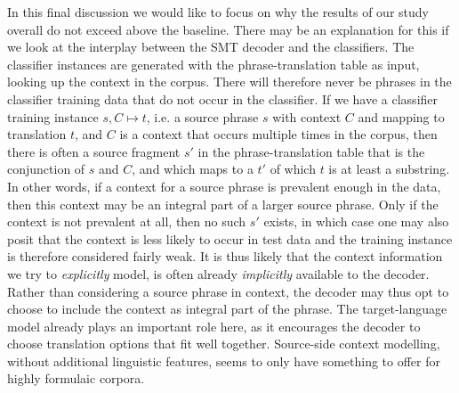 \documentclass[smallextended]{svjour3}       %
\theoremstyle{break}
\begin{document}
In this final discussion we would like to focus on why the results of our study
overall do not exceed above the baseline.  There may be an explanation for this
if we look at the interplay between the SMT decoder and the classifiers. The
classifier instances are generated with the phrase-translation table as input,
looking up the context in the corpus. There will therefore never be phrases in
the classifier training data that do not occur in the classifier. If we have a
classifier training instance $s,C \mapsto t$, i.e.  a source phrase $s$ with
context $C$ and mapping to translation $t$, and $C$ is a context that occurs
multiple times in the corpus, then there is often a source fragment $s'$ in the
phrase-translation table that is the conjunction of $s$ and $C$, and which maps
to a $t'$ of which $t$ is at least a substring. In other words, if a context
for a source phrase is prevalent enough in the data, then this context may be
an integral part of a larger source phrase. Only if the context is not
prevalent at all, then no such $s'$ exists, in which case one may also posit
that the context is less likely to occur in test data and the training instance
is therefore considered fairly weak.  It is thus likely that the context
information we try to \emph{explicitly} model, is often already
\emph{implicitly} available to the decoder.  Rather than considering a source
phrase in context, the decoder may thus opt to choose to include the context as
integral part of the phrase.  The target-language model already plays an
important role here, as it encourages the decoder to choose translation options
that fit well together. Source-side context modelling, without additional
linguistic features, seems to only have something to offer for highly formulaic
corpora. 




\end{document}
